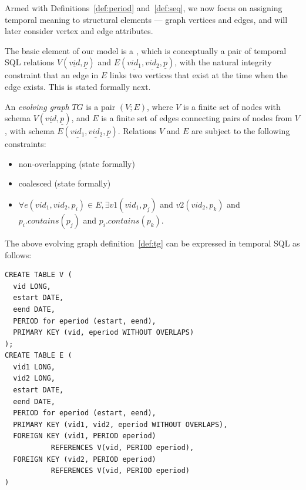 Armed with Definitions~\ref{def:period} and~\ref{def:seq}, we now
focus on assigning temporal meaning to structural elements --- graph
vertices and edges, and will later consider vertex and edge
attributes.

The basic element of our model is a \tg, which is conceptually a pair
of temporal SQL relations $V(\underline{vid}, \underline{p})$ and
$E(\underline{vid_1}, \underline{vid_2}, \underline{p})$, with the
natural integrity constraint that an edge in $E$ links two vertices
that exist at the time when the edge exists.  This is stated formally
next.

\begin{definition}[TGraph]
An {\em evolving graph} $TG$ is a pair $(V;E)$, where $V$ is a finite
set of nodes with schema $V(\underline{vid}, \underline{p})$, and $E$
is a finite set of edges connecting pairs of nodes from $V$, with
schema $E(\underline{vid_1}, \underline{vid_2}, \underline{p})$.
Relations $V$ and $E$ are subject to the following constraints:
\begin{itemize}
\item non-overlapping (state formally) 
\item coalesced (state formally)
\item  $\forall e(vid_1, vid_2, p_i) \in E, \exists v1(vid_1, p_j)$ and
 $v2(vid_2, p_k)$ and $p_i.contains(p_j)$ and $p_i.contains(p_k)$.
\end{itemize}
\label{def:tg}
\end{definition}


The above evolving graph definition~\ref{def:tg} can be expressed in
temporal SQL as follows:

\begin{small}
\begin{verbatim}
CREATE TABLE V (
  vid LONG,
  estart DATE,
  eend DATE,
  PERIOD for eperiod (estart, eend),
  PRIMARY KEY (vid, eperiod WITHOUT OVERLAPS)
);
CREATE TABLE E (
  vid1 LONG,
  vid2 LONG,
  estart DATE,
  eend DATE,
  PERIOD for eperiod (estart, eend),
  PRIMARY KEY (vid1, vid2, eperiod WITHOUT OVERLAPS),
  FOREIGN KEY (vid1, PERIOD eperiod) 
           REFERENCES V(vid, PERIOD eperiod),
  FOREIGN KEY (vid2, PERIOD eperiod) 
           REFERENCES V(vid, PERIOD eperiod)
)
\end{verbatim}
\end{small}

